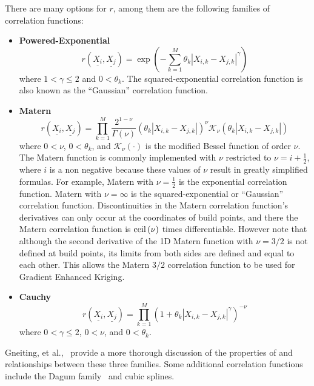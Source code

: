 \documentclass{article}
\begin{document}
There are many options for $r$, among them are the following 
families of correlation functions:
\begin{itemize}
\item {\bf Powered-Exponential}
      \begin{equation}
        r\left(\underline{X_i},\underline{X_j}\right)=\exp\left(-\sum_{k=1}^M \theta_k\left|X_{i,k}-X_{j,k}\right|^\gamma\right)
        \label{Eqn:PowExpCorrFunc}
      \end{equation}
      where $1<\gamma\le2$ and $0<\theta_k$.  The squared-exponential
      correlation function is also known as the ``Gaussian'' correlation 
      function.
\item {\bf Matern}
      \begin{displaymath}
        r\left(\underline{X_i},\underline{X_j}\right)=\prod_{k=1}^M \frac{2^{1-\nu}}{\Gamma(\nu)}\left(\theta_k\left|X_{i,k}-X_{j,k}\right|\right)^\nu\mathcal{K}_\nu\left(\theta_k\left|X_{i,k}-X_{j,k}\right|\right)
      \end{displaymath}
      where $0<\nu$, $0<\theta_k$, and $\mathcal{K}_\nu(\cdot)$ is the 
      modified Bessel function of order $\nu$. The Matern function is 
      commonly implemented with $\nu$ restricted to $\nu=i+\frac{1}{2}$, 
      where $i$ is a non negative because these values of $\nu$ result 
      in greatly simplified formulas.  For example, Matern with 
      $\nu=\frac{1}{2}$
      is the exponential correlation function.  Matern with $\nu=\infty$
      is the squared-exponential or ``Gaussian'' correlation function.
      Discontinuities in the Matern correlation function's derivatives can
      only occur at the coordinates of build points, and there the 
      Matern correlation function is ${\rm ceil}\left(\nu\right)$ 
      times differentiable.  However note that although the second derivative 
      of the 1D Matern function with $\nu=3/2$ is not defined at build points, 
      its limits from both sides are defined and equal to each other.  This
      allows the Matern $3/2$ correlation function to be used for Gradient 
      Enhanced Kriging.
\item {\bf Cauchy}
      \begin{displaymath}
        r\left(\underline{X_i},\underline{X_j}\right)=\prod_{k=1}^M \left(1+\theta_k\left|X_{i,k}-X_{j,k}\right|^\gamma\right)^{-\nu}
      \end{displaymath}
      where $0<\gamma\le2$, $0<\nu$, and $0<\theta_k$.
\end{itemize}
Gneiting, et al.,~\cite{gneiting2007geostatistical} provide a more 
thorough discussion of the properties of and relationships between these
three families.  Some additional correlation functions include the 
Dagum family~\cite{berg2008dagum} and cubic splines.\newline
\end{document}
